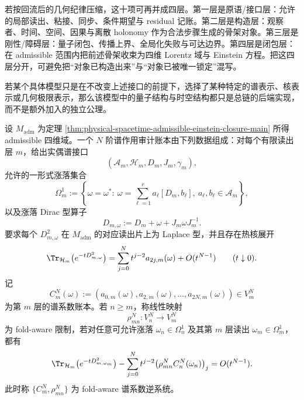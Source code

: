 \begin{remark}[总链的四层读法]
若按回流后的几何纪律压缩，这十项可再并成四层。第一层是原语/接口层：允许的局部读出、粘接、同步、条件期望与 residual 记账。第二层是构造层：观察者、时间、空间、因果与离散 holonomy 作为合法步骤生成的骨架对象。第三层是刚性/障碍层：量子闭包、传播上界、全局化失败与可达边界。第四层是闭包层：在 admissible 范围内把前述骨架收束为四维 Lorentz 域与 Einstein 方程。把这四层分开，可避免把“对象已构造出来”与“对象已被唯一锁定”混写。
\end{remark}

\begin{corollary}[零新增公理原则]\label{cor:physical-spacetime-no-new-axioms}
若某个具体模型只是在不改变上述接口的前提下，选择了某种特定的谱表示、核表示或几何极限表示，那么该模型中的量子结构与时空结构都只是总链的后端实现，而不是额外加入的独立公理。
\end{corollary}
\begin{definition}[有限阶谱作用审计账本]\label{distill:connes_spectral_triples_and_chamseddine_connes_spectral_action-spectral_action_closure_family-ledger-def}
设 \(M_{\mathrm{adm}}\) 为定理 \ref{thm:physical-spacetime-admissible-einstein-closure-main} 所得 admissible 四维域。一个 \(N\) 阶谱作用审计账本由下列数据组成：对每个有限读出层 \(m\)，给出实偶谱接口
\[
(\mathcal A_m,\mathcal H_m,D_m,J_m,\gamma_m),
\]
允许的一形式涨落集合
\[
\Omega_m^1:=\left\{\omega=\omega^\ast:\ \omega=\sum_{\ell=1}^r a_\ell[D_m,b_\ell],\ a_\ell,b_\ell\in\mathcal A_m\right\},
\]
以及涨落 Dirac 型算子
\[
D_{m,\omega}:=D_m+\omega+J_m\omega J_m^{-1}.
\]
要求每个 \(D_{m,\omega}^2\) 在 \(M_{\mathrm{adm}}\) 的对应读出片上为 Laplace 型，并且存在热核展开
\[
\Tr_{\mathcal H_m}\bigl(e^{-tD_{m,\omega}^2}\bigr)
=\sum_{j=0}^{N}t^{j-2}a_{2j,m}(\omega)+O(t^{N-1})
\qquad(t\downarrow0).
\]
记
\[
C_m^N(\omega):=(a_{0,m}(\omega),a_{2,m}(\omega),\ldots,a_{2N,m}(\omega))\in V_m^N
\]
为第 \(m\) 层的谱系数账本。若 \(n\ge m\)，称线性映射
\[
\rho_{mn}^N:V_n^N\longrightarrow V_m^N
\]
为 fold-aware 限制，若对任意可允许涨落 \(\omega_n\in\Omega_n^1\) 及其第 \(m\) 层读出 \(\omega_m\in\Omega_m^1\)，都有
\[
\Tr_{\mathcal H_m}\bigl(e^{-tD_{m,\omega_m}^2}\bigr)
-\sum_{j=0}^{N}t^{j-2}\bigl(\rho_{mn}^N C_n^N(\omega_n)\bigr)_j
=O(t^{N-1}).
\]
此时称 \(\{C_m^N,\rho_{mn}^N\}\) 为 fold-aware 谱系数逆系统。
\end{definition}

